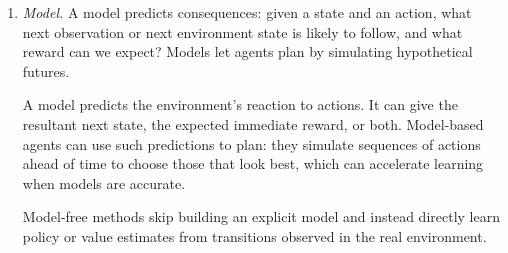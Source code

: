 \begin{enumerate}
    \item \textit{Model.} A model predicts consequences: given a state and an action, what next observation or next environment state is likely to follow, and what reward can we expect? Models let agents plan by simulating hypothetical futures.

    A model predicts the environment’s reaction to actions. It can give the resultant next state, the expected immediate reward, or both. Model-based agents can use such predictions to plan: they simulate sequences of actions ahead of time to choose those that look best, which can accelerate learning when models are accurate.

    Model-free methods skip building an explicit model and instead directly learn policy or value estimates from transitions observed in the real environment.
\end{enumerate}
